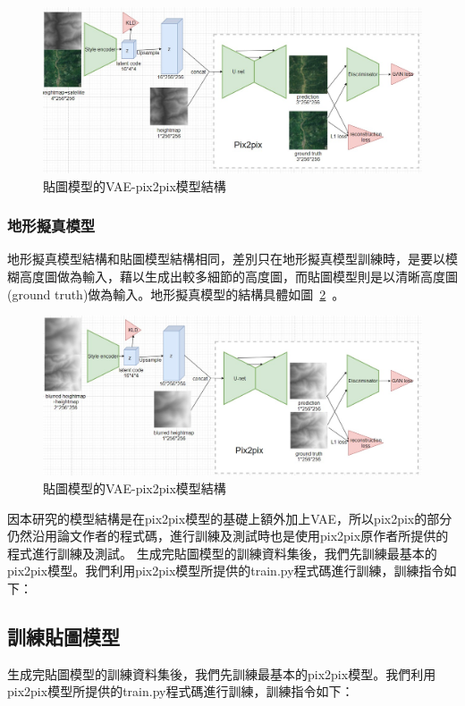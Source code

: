 \documentclass[a4paper, 12pt]{article}
\begin{document}
\begin{figure}[htbp]
    \centering
    \includegraphics[width=\linewidth]{fig/11.jpg}
    \caption{貼圖模型的VAE-pix2pix模型結構}
    \label{fig:11}
\end{figure}

\subsubsection{地形擬真模型}
地形擬真模型結構和貼圖模型結構相同，差別只在地形擬真模型訓練時，是要以模糊高度圖做為輸入，藉以生成出較多細節的高度圖，而貼圖模型則是以清晰高度圖(ground truth)做為輸入。地形擬真模型的結構具體如圖~\ref{fig:12}~。

\begin{figure}[htbp]
    \centering
    \includegraphics[width=\linewidth]{fig/12.jpg}
    \caption{貼圖模型的VAE-pix2pix模型結構}
    \label{fig:12}
\end{figure}

因本研究的模型結構是在pix2pix模型的基礎上額外加上VAE，所以pix2pix的部分仍然沿用論文作者的程式碼，進行訓練及測試時也是使用pix2pix原作者所提供的程式進行訓練及測試。
生成完貼圖模型的訓練資料集後，我們先訓練最基本的pix2pix模型。我們利用pix2pix模型所提供的train.py程式碼進行訓練，訓練指令如下：


\subsection{訓練貼圖模型}
生成完貼圖模型的訓練資料集後，我們先訓練最基本的pix2pix模型。我們利用pix2pix模型所提供的train.py程式碼進行訓練，訓練指令如下：
\end{document}
